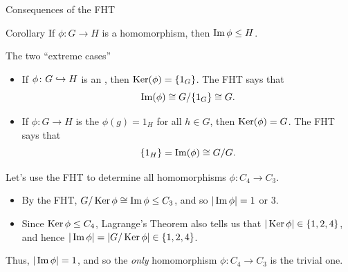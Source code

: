 \documentclass[8pt, handout]{beamer}
\newcommand{\Pause}{}      %
\begin{document}
\begin{frame}{Consequences of the FHT} 
  
  \begin{block}{Corollary}
    If $\phi\colon G\to H$ is a homomorphism, then $\operatorname{Im}\phi\leq H$.
  \end{block}

  \Pause
    
  \begin{exampleblock}{The two ``extreme cases''}%
    \begin{itemize}
    \item If $\phi\colon G\hookrightarrow H$ is an , then
      $\operatorname{Ker}(\phi)=\{1_G\}$. \Pause The FHT says that
      \[
      \operatorname{Im}(\phi)\cong G/\{1_G\}\cong G.
      \]    
      \vspace{-4mm}\Pause
    \item If $\phi\colon G\to H$ is the 
      $\phi(g)=1_H$ for all $h\in G$, then $\operatorname{Ker}(\phi)=G$. \Pause The FHT
      says that
      \[
      \{1_H\}=\operatorname{Im}(\phi)\cong G/G.
      \]
      \vspace{-3mm}
    \end{itemize}  
  \end{exampleblock}
  
  \smallskip\Pause
  
  Let's use the FHT to determine all homomorphisms $\phi\colon
  C_4\to C_3$.
  
  \smallskip\Pause
  
  \begin{itemize}
  \item By the FHT, $G/\operatorname{Ker}\phi\cong\operatorname{Im}\phi\leq C_3$, and so \Pause
    $|\operatorname{Im}\phi|=1$ or $3$. \smallskip\Pause
  \item Since $\operatorname{Ker}\phi\leq C_4$, Lagrange's Theorem also tells us that
    $|\operatorname{Ker}\phi|\in\{1,2,4\}$, \Pause and hence
    $|\operatorname{Im}\phi|=|G/\operatorname{Ker}\phi|\in\{1,2,4\}$. \medskip\Pause
  \end{itemize}
  
  Thus, $|\operatorname{Im}\phi|=1$, and so the \emph{only} homomorphism $\phi\colon C_4\to
  C_3$ is the trivial one.
\end{frame}

\end{document}
